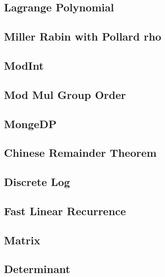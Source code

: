 \subsection{Lagrange Polynomial}


%
\subsection{Miller Rabin with Pollard rho}

\subsection{ModInt}

\subsection{Mod Mul Group Order}

\subsection{MongeDP}

\subsection{Chinese Remainder Theorem}

\subsection{Discrete Log}

\subsection{Fast Linear Recurrence}

\subsection{Matrix}

\subsection{Determinant}

